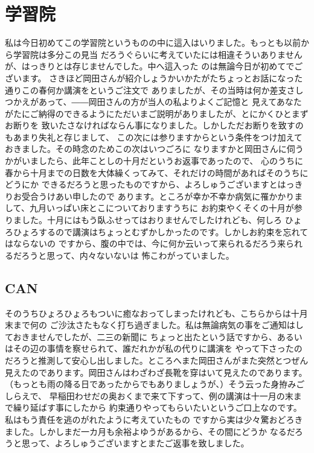 \section{学習院}
私は今日初めてこの学習院というものの中に這入はいりました。もっとも以前から学習院は多分この見当
だろうぐらいに考えていたには相違そういありませんが、はっきりとは存じませんでした。中へ這入った
のは無論今日が初めてでございます。
さきほど岡田さんが紹介しょうかいかたがたちょっとお話になった通りこの春何か講演をというご注文で
ありましたが、その当時は何か差支さしつかえがあって、――岡田さんの方が当人の私よりよくご記憶と
見えてあなたがたにご納得のできるようにただいまご説明がありましたが、とにかくひとまずお断りを
致いたさなければならん事になりました。しかしただお断りを致すのもあまり失礼と存じまして、
この次には参りますからという条件をつけ加えておきました。その時念のためこの次はいつごろに
なりますかと岡田さんに伺うかがいましたら、此年ことしの十月だというお返事であったので、
心のうちに春から十月までの日数を大体繰くってみて、それだけの時間があればそのうちにどうにか
できるだろうと思ったものですから、よろしゅうございますとはっきりお受合うけあい申したので
あります。ところが幸か不幸か病気に罹かかりまして、九月いっぱい床とこについておりますうちに
お約束やくそくの十月が参りました。十月にはもう臥ふせってはおりませんでしたけれども、何しろ
ひょろひょろするので講演はちょっとむずかしかったのです。しかしお約束を忘れてはならないの
ですから、腹の中では、今に何か云いって来られるだろう来られるだろうと思って、内々ないないは
怖こわがっていました。

\subsection{CAN}
そのうちひょろひょろもついに癒なおってしまったけれども、こちらからは十月末まで何の
ご沙汰さたもなく打ち過ぎました。私は無論病気の事をご通知はしておきませんでしたが、二三の新聞に
ちょっと出たという話ですから、あるいはその辺の事情を察せられて、誰だれかが私の代りに講演を
やって下さったのだろうと推測して安心し出しました。ところへまた岡田さんがまた突然とつぜん
見えたのであります。岡田さんはわざわざ長靴を穿はいて見えたのであります。
（もっとも雨の降る日であったからでもありましょうが、）そう云った身拵みごしらえで、
早稲田わせだの奥おくまで来て下すって、例の講演は十一月の末まで繰り延ばす事にしたから
約束通りやってもらいたいというご口上なのです。私はもう責任を逃のがれたように考えていたもの
ですから実は少々驚おどろきました。しかしまだ一カ月も余裕よゆうがあるから、その間にどうか
なるだろうと思って、よろしゅうございますとまたご返事を致しました。

